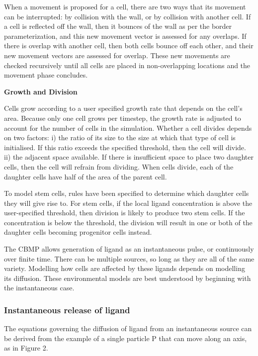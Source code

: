 \documentclass[12pt,a4paper]{report}
\begin{document}
When a movement is proposed for a cell, there are two ways that its 
movement can be interrupted: by collision with the wall, or by collision 
with another cell. If a cell is reflected off the wall, then it bounces 
of the wall as per the border parameterization, and this new movement 
vector is assessed for any overlaps. If there is overlap with another 
cell, then both cells bounce off each other, and their new movement 
vectors are assessed for overlap. These new movements are checked 
recursively until all cells are placed in non-overlapping locations and 
the movement phase concludes.



{\bfseries Growth and Division}

Cells grow according to a user specified growth rate that depends on the 
cell's area. Because only one cell grows per timestep, the growth rate 
is adjusted to account for the number of cells in the simulation. 
Whether a cell divides depends on two factors: i) the ratio of its size 
to the size at which that type of cell is initialised. If this ratio 
exceeds the specified threshold, then the cell will divide. ii) the 
adjacent space available. If there is insufficient space to place two 
daughter cells, then the cell will refrain from dividing. When cells 
divide, each of the daughter cells have half of the area of the parent 
cell. 



To model stem cells, rules have been specified to determine which 
daughter cells they will give rise to. For stem cells, if the local 
ligand concentration is above the user-specified threshold, then 
division is likely to produce two stem cells. If the concentration is 
below the threshold, the division will result in one or both of the 
daughter cells becoming progenitor cells instead.



The CBMP allows generation of ligand as an instantaneous pulse, or 
continuously over finite time. There can be multiple sources, so long as 
they are all of the same variety. Modelling how cells are affected by 
these ligands depends on modelling its diffusion. These environmental 
models are best understood by beginning with the instantaneous case.





\subsubsection{Instantaneous release of 
ligand}
The equations governing the diffusion of ligand from an instantaneous 
source can be derived from the example of a single particle P that can 
move along an axis, as in Figure 2.
\end{document}
